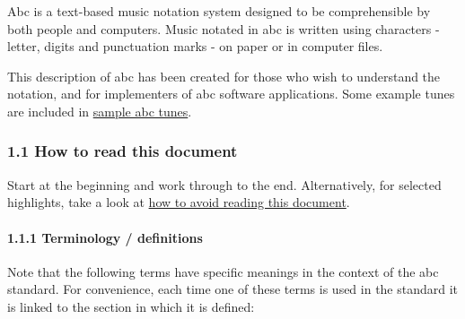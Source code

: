 Abc is a text-based music notation system designed to be comprehensible
by both people and computers. Music notated in abc is written using
characters - letter, digits and punctuation marks - on paper or in
computer files.

This description of abc has been created for those who wish to
understand the notation, and for implementers of abc software
applications. Some example tunes are included in
\protect\hyperlink{sample_abc_tunes}{sample abc tunes}.

\hypertarget{how_to_read_this_document}{\subsubsection{1.1 How to read
this document}\label{how_to_read_this_document}}

Start at the beginning and work through to the end. Alternatively, for
selected highlights, take a look at
\protect\hyperlink{how_to_avoid_reading_this_document}{how to avoid
reading this document}.

\hypertarget{terminology_definitions}{\paragraph{1.1.1 Terminology /
definitions}\label{terminology_definitions}}

Note that the following terms have specific meanings in the context of
the abc standard. For convenience, each time one of these terms is used
in the standard it is linked to the section in which it is defined:

